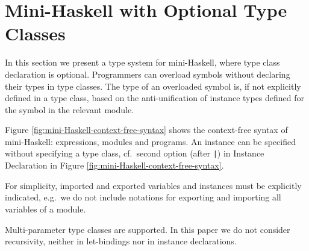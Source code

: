 \section{Mini-Haskell with Optional Type Classes}
\label{Optional-type-classes}

In this section we present a type system for mini-Haskell, where type
class declaration is optional. Programmers can overload symbols
without declaring their types in type classes. The type of an
overloaded symbol is, if not explicitly defined in a type class, based
on the anti-unification of instance types defined for the symbol in
the relevant module.

Figure \ref{fig:mini-Haskell-context-free-syntax} shows the context-free syntax of mini-Haskell: expressions, modules and programs. 
An instance can be specified without specifying
a type class, cf.~second option (after {\tt |}) in Instance Declaration in Figure
\ref{fig:mini-Haskell-context-free-syntax}.



For simplicity, imported and exported variables and instances must be
explicitly indicated, e.g.~we do not include notations for exporting
and importing all variables of a module.

Multi-parameter type classes are supported. In this paper we do not
consider recursivity, neither in let-bindings nor in instance
declarations. \vspace{-.3cm} 


